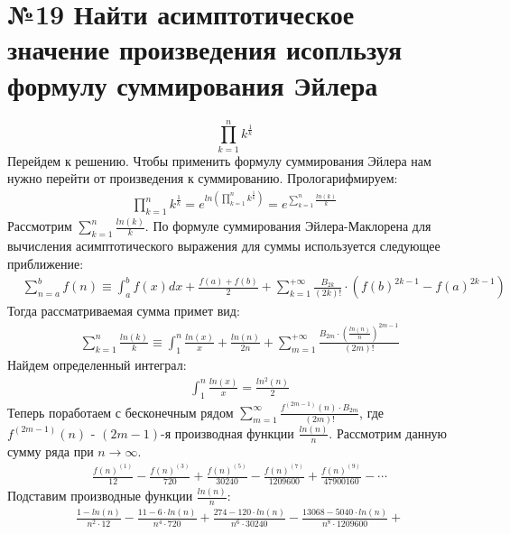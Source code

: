 \documentclass[a4paper,12pt,numbers=noenddot]{scrreprt}
\begin{document}
\section{№19 Найти асимптотическое значение произведения исопльзуя формулу суммирования Эйлера}

\begin{flushleft}
    \begin{equation}
    \prod_{k=1}^{n} k^\frac{1}{k}
    \end{equation}
    Перейдем к решению. Чтобы применить формулу суммирования Эйлера нам нужно перейти от произведения к суммированию. Прологарифмируем:
    \begin{align}
    \prod_{k=1}^{n} k^\frac{1}{k}=e^{ln(\prod_{k=1}^{n} k^\frac{1}{k})} = e^{\sum_{k=1}^{n} \frac{ln(k)}{k}}
    \end{align}
    Рассмотрим $\sum_{k=1}^{n} \frac{ln(k)}{k}$. По формуле суммирования Эйлера-Маклорена для вычисления асимптотического выражения для суммы используется следующее приближение:
    \begin{align}
    & \sum_{n=a}^b f(n) \equiv \int_a^b f(x)dx + \frac{f(a)+f(b)}{2}+\sum_{k=1}^{+\infty} \frac{B_{2k}}{(2k)!} \cdot (f(b)^{2k-1}-f(a)^{2k-1})
    \end{align}
    Тогда рассматриваемая сумма примет вид:
    \begin{align}
    & \sum_{k=1}^{n} \frac{ln(k)}{k} \equiv \int_1^n \frac{ln(x)}{x} + \frac{ln(n)}{2n} + \sum_{m=1}^{+\infty} \frac{B_{2m}\cdot (\frac{ln(n)}{n})^{2m-1}}{(2m)!}
    \end{align}
    Найдем определенный интеграл:
    \begin{align}
    & \int_1^n \frac{ln(x)}{x} = \frac{ln^2(n)}{2}
    \end{align}
    Теперь поработаем с бесконечным рядом $\sum_{m=1}^\infty \frac{f^{(2m-1)}(n) \cdot B_{2m}}{(2m)!}$, где $f^{(2m-1)}(n)$ - $(2m-1)$-я производная функции $\frac{ln(n)}{n}$. Рассмотрим данную сумму ряда при $n \rightarrow \infty$.
    \begin{align}
    & \frac{f(n)^{(1)}}{12} - \frac{f(n)^{(3)}}{720} + \frac{f(n)^{(5)}}{30240} - \frac{f(n)^{(7)}}{1209600} + \frac{f(n)^{(9)}}{47900160} - \cdots
    \end{align}
    Подставим производные функции $\frac{ln(n)}{n}$:
    \begin{align}
    & \frac{1-ln(n)}{n^2 \cdot 12} - \frac{11-6 \cdot ln(n)}{n^4 \cdot 720} + \frac{274-120 \cdot ln(n)}{n^6 \cdot 30240} - \frac{13068-5040 \cdot ln(n)}{n^8 \cdot 1209600} + \\&

\end{align}
\end{flushleft}
\end{document}

